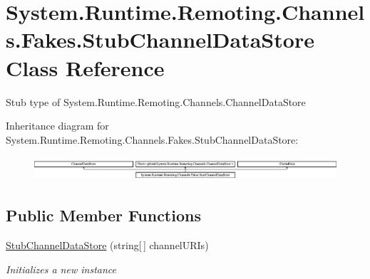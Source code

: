 \hypertarget{class_system_1_1_runtime_1_1_remoting_1_1_channels_1_1_fakes_1_1_stub_channel_data_store}{\section{System.\-Runtime.\-Remoting.\-Channels.\-Fakes.\-Stub\-Channel\-Data\-Store Class Reference}
\label{class_system_1_1_runtime_1_1_remoting_1_1_channels_1_1_fakes_1_1_stub_channel_data_store}
}


Stub type of System.\-Runtime.\-Remoting.\-Channels.\-Channel\-Data\-Store 


Inheritance diagram for System.\-Runtime.\-Remoting.\-Channels.\-Fakes.\-Stub\-Channel\-Data\-Store\-:\begin{figure}[H]
\begin{center}
\leavevmode
\includegraphics[height=0.895284cm]{class_system_1_1_runtime_1_1_remoting_1_1_channels_1_1_fakes_1_1_stub_channel_data_store}
\end{center}
\end{figure}
\subsection*{Public Member Functions}
\begin{DoxyCompactItemize}
\item 
\hyperlink{class_system_1_1_runtime_1_1_remoting_1_1_channels_1_1_fakes_1_1_stub_channel_data_store_a76e481c50cdf1ea0adae88de97bd7a07}{Stub\-Channel\-Data\-Store} (string\mbox{[}$\,$\mbox{]} channel\-U\-R\-Is)
\begin{DoxyCompactList}\small\item\em Initializes a new instance\end{DoxyCompactList}\end{DoxyCompactItemize}
